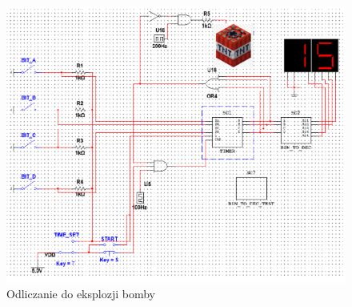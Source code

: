 \documentclass{article}
\begin{document}
\begin{itemize}
\begin{figure}[H]
            \includegraphics{images/bomba}
            \caption{Odliczanie do eksplozji bomby}
        \end{figure}
    \end{itemize}
    
    
\end{document}

